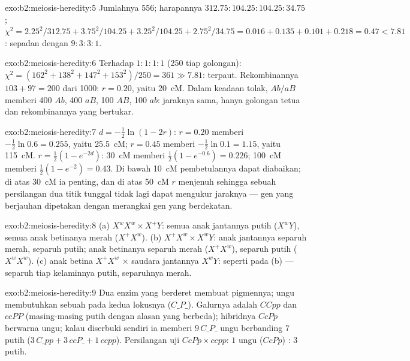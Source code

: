 \begin{solution}{exo:b2:meiosis-heredity:5}
Jumlahnya 556; harapannya $312.75 : 104.25 : 104.25 : 34.75$; $\chi^2 =
2.25^2/312.75 + 3.75^2/104.25 + 3.25^2/104.25 + 2.75^2/34.75 = 0.016
+ 0.135 + 0.101 + 0.218 = 0.47 < 7.81$: sepadan dengan $9 : 3 : 3 :
1$.
\end{solution}

\begin{solution}{exo:b2:meiosis-heredity:6}
Terhadap $1 : 1 : 1 : 1$ (250 tiap golongan): $\chi^2 = (162^2 + 138^2 + 147^2
+ 153^2)/250 = 361 \gg 7.81$: terpaut. Rekombinannya $103 + 97 = 200$
dari 1000: $r = 0.20$, yaitu \qty{20}{cM}. Dalam keadaan tolak, $Ab/aB$
memberi 400 $Ab$, 400 $aB$, 100 $AB$, 100 $ab$: jaraknya sama, hanya
golongan tetua dan rekombinannya yang bertukar.
\end{solution}

\begin{solution}{exo:b2:meiosis-heredity:7}
$d = -\tfrac12\ln(1 - 2r)$: $r = 0.20$ memberi $-\tfrac12\ln 0.6 =
0.255$, yaitu \qty{25.5}{cM}; $r = 0.45$ memberi
$-\tfrac12\ln 0.1 = 1.15$, yaitu \qty{115}{cM}.
$r = \tfrac12(1 - e^{-2d})$: \qty{30}{cM} memberi
$\tfrac12(1 - e^{-0.6}) = 0.226$; \qty{100}{cM} memberi $\tfrac12(1 -
e^{-2}) = 0.43$. Di bawah \qty{10}{cM} pembetulannya
dapat diabaikan; di atas \qty{30}{cM} ia penting, dan di atas
\qty{50}{cM} $r$ menjenuh sehingga sebuah persilangan dua titik tunggal
tidak lagi dapat mengukur jaraknya --- gen yang berjauhan dipetakan
dengan merangkai gen yang berdekatan.
\end{solution}

\begin{solution}{exo:b2:meiosis-heredity:8}
(a) $X^wX^w \times X^+Y$: semua anak jantannya putih ($X^wY$), semua
anak betinanya merah ($X^+X^w$). (b) $X^+X^w \times X^wY$: anak
jantannya separuh merah, separuh putih; anak betinanya separuh merah
($X^+X^w$), separuh putih ($X^wX^w$). (c) anak betina $X^+X^w$
$\times$ saudara jantannya $X^wY$: seperti pada (b) --- separuh tiap
kelaminnya putih, separuhnya merah.
\end{solution}

\begin{solution}{exo:b2:meiosis-heredity:9}
Dua enzim yang berderet membuat pigmennya; ungu membutuhkan sebuah 
 pada kedua lokusnya ($C\_P\_$). Galurnya adalah $CCpp$ dan
$ccPP$ (masing-masing putih dengan alasan yang berbeda); hibridnya
$CcPp$ berwarna ungu; kalau diserbuki sendiri ia memberi $9\,C\_P\_$
ungu berbanding $7$ putih ($3\,C\_pp + 3\,ccP\_ +
1\,ccpp$). Persilangan uji $CcPp\times ccpp$: $1$ ungu ($CcPp$) : $3$
putih.
\end{solution}

